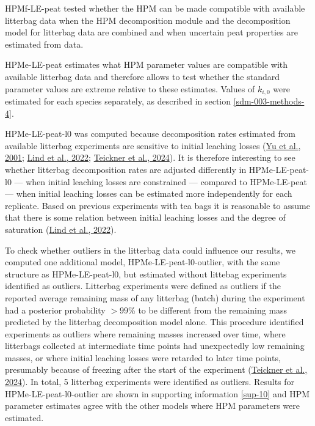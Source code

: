 \documentclass[
  12pt,
]{article}
\begin{document}
HPMf-LE-peat tested whether the HPM can be made compatible with available litterbag data when the HPM decomposition module and the decomposition model for litterbag data are combined and when uncertain peat properties are estimated from data.

HPMe-LE-peat estimates what HPM parameter values are compatible with available litterbag data and therefore allows to test whether the standard parameter values are extreme relative to these estimates. Values of \(k_{i,0}\) were estimated for each species separately, as described in section \ref{sdm-003-methods-4}.

HPMe-LE-peat-l0 was computed because decomposition rates estimated from available litterbag experiments are sensitive to initial leaching losses (\protect\hyperlink{ref-Yu.2001}{Yu et al., 2001}; \protect\hyperlink{ref-Lind.2022}{Lind et al., 2022}; \protect\hyperlink{ref-Teickner.2024}{Teickner et al., 2024}). It is therefore interesting to see whether litterbag decomposition rates are adjusted differently in HPMe-LE-peat-l0 --- when initial leaching losses are constrained --- compared to HPMe-LE-peat --- when initial leaching losses can be estimated more independently for each replicate. Based on previous experiments with tea bags it is reasonable to assume that there is some relation between initial leaching losses and the degree of saturation (\protect\hyperlink{ref-Lind.2022}{Lind et al., 2022}).

To check whether outliers in the litterbag data could influence our results, we computed one additional model, HPMe-LE-peat-l0-outlier, with the same structure as HPMe-LE-peat-l0, but estimated without littebag experiments identified as outliers. Litterbag experiments were defined as outliers if the reported average remaining mass of any litterbag (batch) during the experiment had a posterior probability \(>99\)\% to be different from the remaining mass predicted by the litterbag decomposition model alone. This procedure identified experiments as outliers where remaining masses increased over time, where litterbags collected at intermediate time points had unexpectedly low remaining masses, or where initial leaching losses were retarded to later time points, presumably because of freezing after the start of the experiment (\protect\hyperlink{ref-Teickner.2024}{Teickner et al., 2024}). In total, 5 litterbag experiments were identified as outliers. Results for HPMe-LE-peat-l0-outlier are shown in supporting information \ref{sup-10} and HPM parameter estimates agree with the other models where HPM parameters were estimated.
\end{document}
